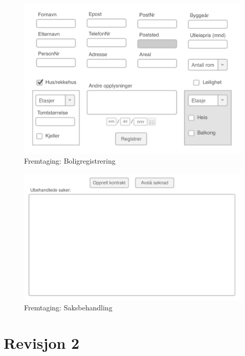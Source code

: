 \begin{figure}[ht]
\center
 \includegraphics[scale=0.5]{./img/appendix/gui_forslag/rev_1/RegBolig.png}
 \caption{Fremtaging: Boligregistrering}
 \label{fig:DEV:RegBolig}
\end{figure}

\begin{figure}[ht]
\center
 \includegraphics[scale=0.5]{./img/appendix/gui_forslag/rev_1/Saksbehandling.png}
 \caption{Fremtaging: Saksbehandling}
 \label{fig:DEV:Saksbehandling}
\end{figure}



\section{Revisjon 2}

